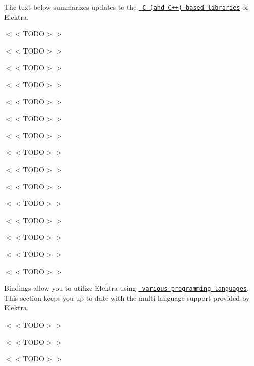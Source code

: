 The text below summarizes updates to the \href{https://www.libelektra.org/libraries/readme}{\texttt{ C (and C++)-\/based libraries}} of Elektra.


\begin{DoxyItemize}
\item $<$$<$\+T\+O\+D\+O$>$$>$
\item $<$$<$\+T\+O\+D\+O$>$$>$
\item $<$$<$\+T\+O\+D\+O$>$$>$
\end{DoxyItemize}


\begin{DoxyItemize}
\item $<$$<$\+T\+O\+D\+O$>$$>$
\item $<$$<$\+T\+O\+D\+O$>$$>$
\item $<$$<$\+T\+O\+D\+O$>$$>$
\end{DoxyItemize}


\begin{DoxyItemize}
\item $<$$<$\+T\+O\+D\+O$>$$>$
\item $<$$<$\+T\+O\+D\+O$>$$>$
\item $<$$<$\+T\+O\+D\+O$>$$>$
\end{DoxyItemize}


\begin{DoxyItemize}
\item $<$$<$\+T\+O\+D\+O$>$$>$
\item $<$$<$\+T\+O\+D\+O$>$$>$
\item $<$$<$\+T\+O\+D\+O$>$$>$
\end{DoxyItemize}


\begin{DoxyItemize}
\item $<$$<$\+T\+O\+D\+O$>$$>$
\item $<$$<$\+T\+O\+D\+O$>$$>$
\item $<$$<$\+T\+O\+D\+O$>$$>$
\end{DoxyItemize}

Bindings allow you to utilize Elektra using \href{https://www.libelektra.org/bindings/readme}{\texttt{ various programming languages}}. This section keeps you up to date with the multi-\/language support provided by Elektra.


\begin{DoxyItemize}
\item $<$$<$\+T\+O\+D\+O$>$$>$
\item $<$$<$\+T\+O\+D\+O$>$$>$
\item $<$$<$\+T\+O\+D\+O$>$$>$
\end{DoxyItemize}



